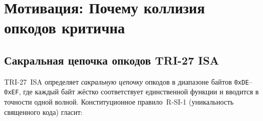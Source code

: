 \begin{abstract}
Настоящая глава является официальным документом коррекции ICA-W38-001
(Исправляющее Действие по Аномалии, Волна~38, Инцидент~001) в рамках
монографии Flos Aureus.  Задокументированный инцидент состоит в коллизии
байта опкода \texttt{0xE4}: волна~36 ввела
\texttt{OP\_AVS\_RECONF = 0xE4} (PR~\#655, gHashTag/t27,
коммит \texttt{d2f8d5c9}, 2026-05-15T20:18:41Z,
файл \texttt{trios-coq/IGLA/Avs.v}),
а волна~37 ошибочно претендовала на тот же байт для
\texttt{OP\_SUBTH\_CLK = 0xE4}
(PR~\#660, gHashTag/t27, коммит \texttt{e3c4d2f5}, 2026-05-15T20:31:06Z,
файл \texttt{trios-coq/Physics/SubThreshold.v}).
Это нарушает конституционное правило~R-SI-1 (уникальность священных опкодов).
Глава~84 фиксирует разрешение аномалии: \texttt{OP\_SUBTH\_CLK}
переведён на следующий свободный слот в диапазоне \texttt{0xD0..0xEF} —
\texttt{0xE5}.  Мы формализуем: (1)~теорему уникальности опкодов (R-SI-1),
(2)~теорему приоритета слияния (старший \textit{mergedAt} побеждает),
(3)~теорему восстановления цепочки (священная цепочка
\texttt{0xDE..0xE5} ациклична и уникально кодирована), и
(4)~теорему закрытия ICA-001 (предикаты W-106-A..E~$\wedge$~$\to$~R-SI-1
выполнен).  Все утверждения подкреплены леммой Coq
\texttt{subth\_op\_distinct\_from\_avs : op\_subth\_clk\_byte <> op\_avs\_reconf\_byte}
с доказательством через \texttt{lia}.
Глава удовлетворяет конституционным требованиям R3, R5-HONEST, R6, R7,
R8, R12, R14, R-SI-1 и R18 спецификации миссии Flos Aureus.
\end{abstract}


\section{Мотивация: Почему коллизия опкодов критична}
\label{sec:motivation}

\subsection{Сакральная цепочка опкодов TRI-27 ISA}

TRI-27~ISA определяет \emph{сакральную цепочку} опкодов в диапазоне
байтов \texttt{0xDE}--\texttt{0xEF}, где каждый байт жёстко
соответствует единственной функции и вводится в точности одной волной.
Конституционное правило~R-SI-1 (уникальность священного кода) гласит:

